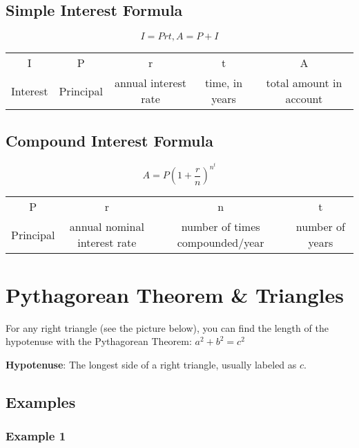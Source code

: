 \documentclass[letterpaper, 10pt]{article}
\begin{document}
\subsection{Simple Interest Formula}
$$I = Prt, A = P+I$$
\noindent \begin{tabular}{|c|c|c|c|c|}
	\hline
	I & P & r & t & A \\
	Interest & Principal & annual interest rate & time, in years & total amount in account \\ 
	\hline
\end{tabular}

\subsection{Compound Interest Formula}
$$A = P\left(1 + \frac{r}{n}\right)^n^t$$
\noindent \begin{tabular}{|c|c|c|c|}
	\hline
	P & r & n & t \\
	Principal & annual nominal interest rate & number of times compounded/year & number of years \\
	\hline
\end{tabular}

\section{Pythagorean Theorem \& Triangles}

For any right triangle (see the picture below), you can find the length of the hypotenuse with the Pythagorean Theorem: $a^2 + b^2 = c^2$

\noindent \textbf{Hypotenuse}: The longest side of a right triangle, usually labeled as $c$.


\subsection{Examples}
\subsubsection{Example 1}
\end{document}
